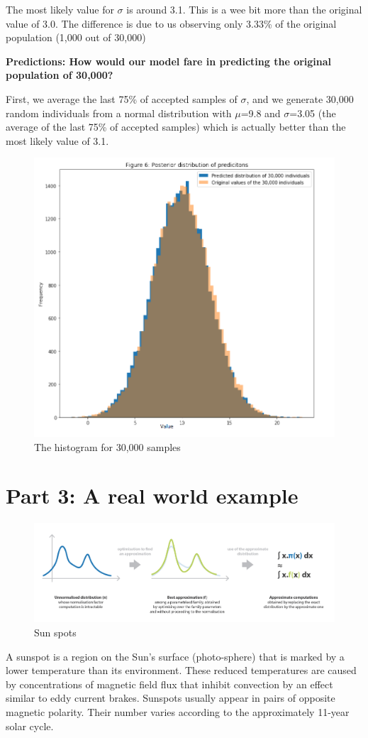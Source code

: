 The most likely value for $\sigma$ is around 3.1. This is a wee bit more than the original value of 3.0. The difference is due to us observing only 3.33\% of the original population (1,000 out of 30,000)

\textbf{Predictions: How would our model fare in predicting the original population of 30,000?}

First, we average the last 75\% of accepted samples of $\sigma$, and we generate 30,000 random individuals from a normal distribution with  $\mu$=9.8 and $\sigma$=3.05 (the average of the last 75\% of accepted samples) which is actually better than the most likely value of 3.1.

\begin{figure}[h]
    \centering
\includegraphics[width=.6\textwidth]{pic/p05c08-snip05}
    \caption{The histogram for 30,000 samples}
    \label{fig:p05c08-snip05}
\end{figure}

\section{Part 3: A real world example}

\begin{figure}[h]
    \centering
\includegraphics[width=.6\textwidth]{pic/p05c08-snip06}
    \caption{Sun spots}
    \label{fig:p05c08-snip06}
\end{figure}

A sunspot is a region on the Sun's surface (photo-sphere) that is marked by a lower temperature than its environment. These reduced temperatures are caused by concentrations of magnetic field flux that inhibit convection by an effect similar to eddy current brakes. Sunspots usually appear in pairs of opposite magnetic polarity. Their number varies according to the approximately 11-year solar cycle.

